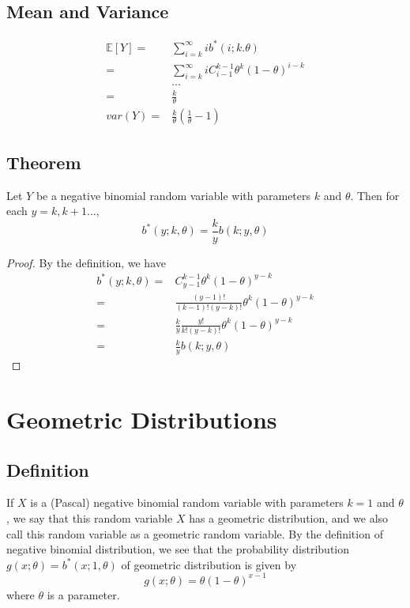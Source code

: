 \documentclass[titlepage]{article}
\begin{document}
        \subsection*{Mean and Variance}
            \begin{equation*}
                \begin{split}
                    \mathbb{E}[Y]=&\sum_{i=k}^\infty ib^*(i;k.\theta)\\
                        =&\sum_{i=k}^\infty iC_{i-1}^{k-1}\theta^k(1-\theta)^{i-k}\\
                        &...\\
                        =&\frac{k}{\theta}\\
                    var(Y)=&\frac{k}{\theta}(\frac{1}{\theta}-1)
                \end{split}
            \end{equation*}

        \subsection*{Theorem}
            Let $Y$ be a negative binomial random variable with parameters $k$ and $\theta$. Then for each $y=k,k+1...$,
            $$b^*(y;k,\theta)=\frac{k}{y}b(k;y,\theta)$$
            \begin{proof}
                By the definition, we have 
                \begin{equation*}
                    \begin{split}
                        b^*(y;k,\theta)=&C_{y-1}^{k-1}\theta^k(1-\theta)^{y-k}\\
                            =&\frac{(y-1)!}{(k-1)!(y-k)!}\theta^k(1-\theta)^{y-k}\\
                            =&\frac{k}{y}\frac{y!}{k!(y-k)!}\theta^k(1-\theta)^{y-k}\\
                            =&\frac{k}{y}b(k;y,\theta)
                    \end{split}
                \end{equation*}
            \end{proof}
    \section{Geometric Distributions}
        \subsection*{Definition}
            If $X$ is a (Pascal) negative binomial random variable with parameters $k=1$ and $\theta$, we say that this random variable $X$ has a geometric distribution, and we also call this random variable as a geometric random variable. By the definition of negative binomial distribution, we see that the probability distribution $g(x;\theta)=b^*(x;1,\theta)$ of geometric distribution is given by 
            $$g(x;\theta)=\theta(1-\theta)^{x-1}$$
            where $\theta$ is a parameter.
\end{document}
